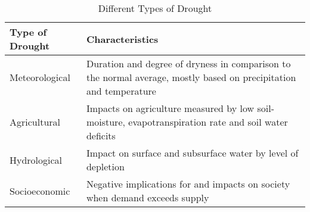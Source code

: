 





\begin{table}
    \caption{Different Types of Drought}
    \begin{adjustbox}{center,max width=\linewidth}
        \def\arraystretch{1.5}
        \begin{tabular}{m{2cm}m{5cm}}
            \toprule
            \bf Type of Drought & \bf Characteristics  \\ 
            \midrule
            Meteorological      & Duration and degree of dryness in comparison to the normal average, mostly based on precipitation and temperature  \\ 
            Agricultural        & Impacts on agriculture measured by low soil-moisture, evapotranspiration rate and soil water deficits  \\ 
            Hydrological        & Impact on surface and subsurface water by level of depletion  \\ 
            Socioeconomic       & Negative implications for and impacts on society when demand exceeds supply  \\ 
            \bottomrule
        \end{tabular}
    \end{adjustbox}
    \label{tab:th_drought_types}
\end{table}


